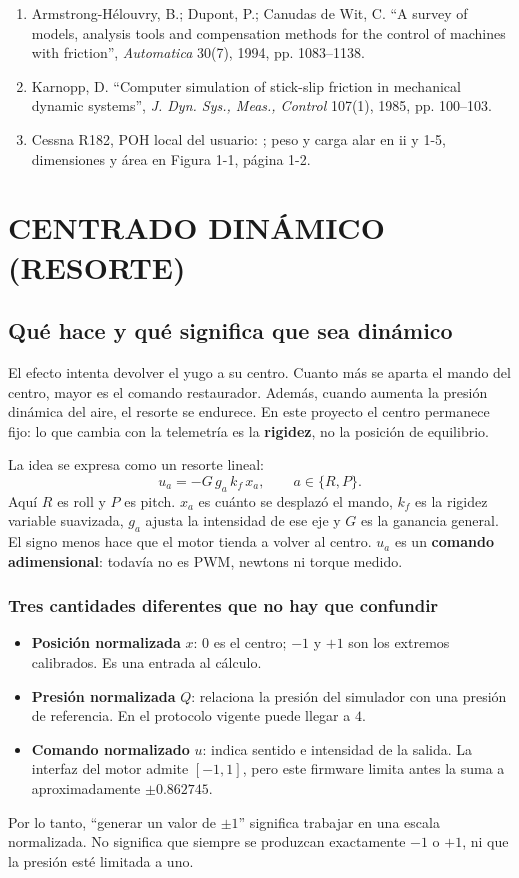 \documentclass[11pt,a4paper]{article}
\begin{document}
\begin{enumerate}
\item Armstrong-Hélouvry, B.; Dupont, P.; Canudas de Wit, C. ``A survey of models, analysis tools and compensation methods for the control of machines with friction'', \textit{Automatica} 30(7), 1994, pp. 1083--1138.
\item Karnopp, D. ``Computer simulation of stick-slip friction in mechanical dynamic systems'', \textit{J. Dyn. Sys., Meas., Control} 107(1), 1985, pp. 100--103.
\item Cessna R182, POH local del usuario: ; peso y carga alar en ii y 1-5, dimensiones y área en Figura 1-1, página 1-2.
\end{enumerate}


\section{CENTRADO DINÁMICO (RESORTE)}

\subsection{Qué hace y qué significa que sea dinámico}
El efecto intenta devolver el yugo a su centro. Cuanto más se aparta el mando del centro, mayor es el comando restaurador. Además, cuando aumenta la presión dinámica del aire, el resorte se endurece. En este proyecto el centro permanece fijo: lo que cambia con la telemetría es la \textbf{rigidez}, no la posición de equilibrio.

La idea se expresa como un resorte lineal:
\begin{equation}
u_a=-G\,g_a\,k_f\,x_a,\qquad a\in\{R,P\}.
\label{eq:resorte}
\end{equation}
Aquí $R$ es roll y $P$ es pitch. $x_a$ es cuánto se desplazó el mando, $k_f$ es la rigidez variable suavizada, $g_a$ ajusta la intensidad de ese eje y $G$ es la ganancia general. El signo menos hace que el motor tienda a volver al centro. $u_a$ es un \textbf{comando adimensional}: todavía no es PWM, newtons ni torque medido.

\subsubsection{Tres cantidades diferentes que no hay que confundir}
\begin{itemize}
\item \textbf{Posición normalizada} $x$: $0$ es el centro; $-1$ y $+1$ son los extremos calibrados. Es una entrada al cálculo.
\item \textbf{Presión normalizada} $Q$: relaciona la presión del simulador con una presión de referencia. En el protocolo vigente puede llegar a $4$.
\item \textbf{Comando normalizado} $u$: indica sentido e intensidad de la salida. La interfaz del motor admite $[-1,1]$, pero este firmware limita antes la suma a aproximadamente $\pm0.862745$.
\end{itemize}
Por lo tanto, ``generar un valor de $\pm1$'' significa trabajar en una escala normalizada. No significa que siempre se produzcan exactamente $-1$ o $+1$, ni que la presión esté limitada a uno.
\end{document}
